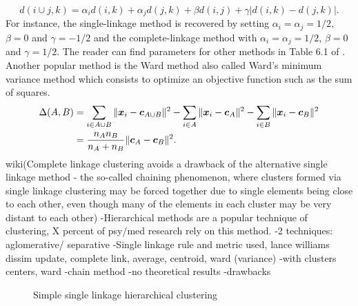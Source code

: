 \begin{equation}
  d(i \cup j,k) = \alpha_id(i,k)+\alpha_jd(j,k)+\beta d(i, j) +\gamma |d(i,k)-d(j,k)|.
\end{equation}
For instance, the single-linkage method is recovered by setting $\alpha_i =\alpha_j = 1/2$, $\beta =0$ and $\gamma =-1/2$ and the complete-linkage method with $\alpha_i =\alpha_j = 1/2$, $\beta =0$ and $\gamma =1/2$. The reader can find parameters for other methods in Table 6.1 of \citep{hennig2015handbook}.
Another popular method is the Ward method also called Ward's minimum variance method which consists to optimize an objective function such as the sum of squares. 
\begin{align*}
  \Delta(A,B) &= \sum_{i\in A\cup B} \|\boldsymbol x_i - \boldsymbol c_{A \cup B} \|^2-\sum_{i\in A} \|\boldsymbol x_i - \boldsymbol c_{A} \|^2-\sum_{i\in B} \|\boldsymbol x_i - \boldsymbol c_{B} \|^2\\
  &= \frac{n_An_B}{n_A+ n_B}\|\boldsymbol c_A - \boldsymbol c_B \|^2.
\end{align*}
wiki(Complete linkage clustering avoids a drawback of the alternative single linkage method - the so-called chaining phenomenon, where clusters formed via single linkage clustering may be forced together due to single elements being close to each other, even though many of the elements in each cluster may be very distant to each other)
-Hierarchical methods are a popular technique of clustering, X percent of psy/med research rely on this method.
-2 techniques: aglomerative/ separative
-Single linkage rule and metric used, lance williams dissim update, complete link, average, centroid, ward (variance)
-with clusters centers, ward
-chain method
-no theoretical results
-drawbacks

\begin{figure}[h]
\begin{center}
   \caption{Simple single linkage hierarchical clustering}
   \label{algo:single_linkage_hier_algo}
\end{center}
\vspace{-15pt}
\end{figure}


